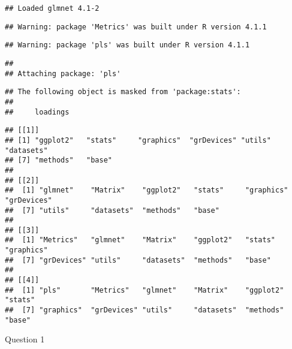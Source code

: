 \documentclass[
]{article}
\begin{document}
\begin{verbatim}
## Loaded glmnet 4.1-2
\end{verbatim}

\begin{verbatim}
## Warning: package 'Metrics' was built under R version 4.1.1
\end{verbatim}

\begin{verbatim}
## Warning: package 'pls' was built under R version 4.1.1
\end{verbatim}

\begin{verbatim}
## 
## Attaching package: 'pls'
\end{verbatim}

\begin{verbatim}
## The following object is masked from 'package:stats':
## 
##     loadings
\end{verbatim}

\begin{verbatim}
## [[1]]
## [1] "ggplot2"   "stats"     "graphics"  "grDevices" "utils"     "datasets" 
## [7] "methods"   "base"     
## 
## [[2]]
##  [1] "glmnet"    "Matrix"    "ggplot2"   "stats"     "graphics"  "grDevices"
##  [7] "utils"     "datasets"  "methods"   "base"     
## 
## [[3]]
##  [1] "Metrics"   "glmnet"    "Matrix"    "ggplot2"   "stats"     "graphics" 
##  [7] "grDevices" "utils"     "datasets"  "methods"   "base"     
## 
## [[4]]
##  [1] "pls"       "Metrics"   "glmnet"    "Matrix"    "ggplot2"   "stats"    
##  [7] "graphics"  "grDevices" "utils"     "datasets"  "methods"   "base"
\end{verbatim}

Question 1
\end{document}
